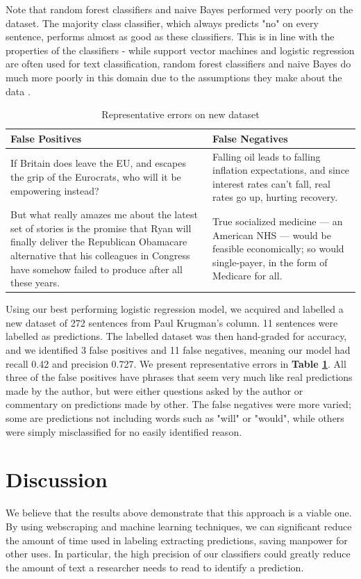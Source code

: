 \documentclass[11pt,letterpaper]{article}
\begin{document}
Note that random forest classifiers and naive Bayes performed very poorly on the dataset. The majority class classifier, which always predicts "no" on every sentence, performs almost as good as these classifiers. This is in line with the properties of the classifiers - while support vector machines and logistic regression are often used for text classification, random forest classifiers and naive Bayes do much more poorly in this domain due to the assumptions they make about the data \cite{Hastie:13}.

\begin{table}
\centering
 \begin{tabular}{| p{6.5cm} | p{6.5cm} |} 
 \hline
\textbf{False Positives} & \textbf{False Negatives}  \\
 \hline
If Britain does leave the EU, and escapes the grip of the Eurocrats, who will it be empowering instead? & Falling oil leads to falling inflation expectations, and since interest rates can't fall, real rates go up, hurting recovery.\\
\hline
But what really amazes me about the latest set of stories is the promise that Ryan will finally deliver the Republican Obamacare alternative that his colleagues in Congress have somehow failed to produce after all these years. & True socialized medicine — an American NHS — would be feasible economically; so would single-payer, in the form of Medicare for all.\\
 \hline
 \end{tabular}
 \caption{Representative errors on new dataset}
 \label{errors}
\end{table}
Using our best performing logistic regression model, we acquired and labelled a new dataset of 272 sentences from Paul Krugman's column. 11 sentences were labelled as predictions. The labelled dataset was then hand-graded for accuracy, and we identified 3 false positives and 11 false negatives, meaning our model had recall 0.42 and precision 0.727. We present representative errors in \textbf{Table \ref{errors}}. All three of the false positives have phrases that seem very much like real predictions made by the author, but were either questions asked by the author or commentary on predictions made by other. The false negatives were more varied; some are predictions not including words such as "will" or "would", while others were simply misclassified for no easily identified reason.  

\section{Discussion}
\label{discussion}
We believe that the results above demonstrate that this approach is a viable one. By using webscraping and machine learning techniques, we can significant reduce the amount of time used in labeling extracting predictions, saving manpower for other uses. In particular, the high precision of our classifiers could greatly reduce the amount of text a researcher needs to read to identify a prediction.
\end{document}
